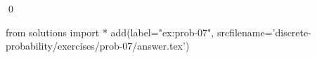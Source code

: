 
\begin{ex} 
  \label{ex:prob-07}
  
  \qed
\end{ex} 
\begin{python0}
from solutions import *
add(label="ex:prob-07",
    srcfilename='discrete-probability/exercises/prob-07/answer.tex') 
\end{python0}
